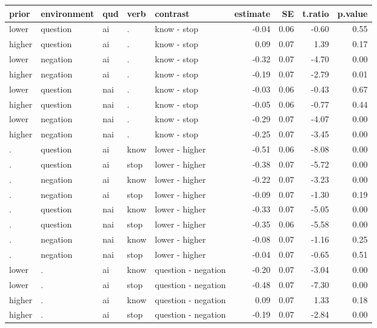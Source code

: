 \documentclass{article}
\begin{document}
\begin{tabular}{lllllrrrr}
  \hline
prior & environment & qud & verb & contrast & estimate & SE & t.ratio & p.value \\ 
  \hline
lower & question & ai & . & know - stop & -0.04 & 0.06 & -0.60 & 0.55 \\ 
  higher & question & ai & . & know - stop & 0.09 & 0.07 & 1.39 & 0.17 \\ 
  lower & negation & ai & . & know - stop & -0.32 & 0.07 & -4.70 & 0.00 \\ 
  higher & negation & ai & . & know - stop & -0.19 & 0.07 & -2.79 & 0.01 \\ 
  lower & question & nai & . & know - stop & -0.03 & 0.06 & -0.43 & 0.67 \\ 
  higher & question & nai & . & know - stop & -0.05 & 0.06 & -0.77 & 0.44 \\ 
  lower & negation & nai & . & know - stop & -0.29 & 0.07 & -4.07 & 0.00 \\ 
  higher & negation & nai & . & know - stop & -0.25 & 0.07 & -3.45 & 0.00 \\ 
  . & question & ai & know & lower - higher & -0.51 & 0.06 & -8.08 & 0.00 \\ 
  . & question & ai & stop & lower - higher & -0.38 & 0.07 & -5.72 & 0.00 \\ 
  . & negation & ai & know & lower - higher & -0.22 & 0.07 & -3.23 & 0.00 \\ 
  . & negation & ai & stop & lower - higher & -0.09 & 0.07 & -1.30 & 0.19 \\ 
  . & question & nai & know & lower - higher & -0.33 & 0.07 & -5.05 & 0.00 \\ 
  . & question & nai & stop & lower - higher & -0.35 & 0.06 & -5.58 & 0.00 \\ 
  . & negation & nai & know & lower - higher & -0.08 & 0.07 & -1.16 & 0.25 \\ 
  . & negation & nai & stop & lower - higher & -0.04 & 0.07 & -0.65 & 0.51 \\ 
  lower & . & ai & know & question - negation & -0.20 & 0.07 & -3.04 & 0.00 \\ 
  lower & . & ai & stop & question - negation & -0.48 & 0.07 & -7.30 & 0.00 \\ 
  higher & . & ai & know & question - negation & 0.09 & 0.07 & 1.33 & 0.18 \\ 
  higher & . & ai & stop & question - negation & -0.19 & 0.07 & -2.84 & 0.00 \\ 

\end{tabular}
\end{document}
